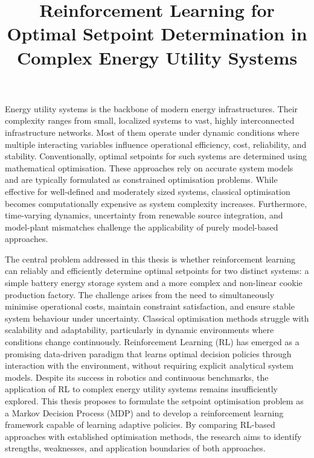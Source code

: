 
\title{Reinforcement Learning for Optimal Setpoint Determination in Complex Energy Utility Systems}
\maketitle

\par
Energy utility systems is the backbone of modern energy infrastructures. Their complexity ranges from small, localized systems to vast, highly interconnected infrastructure networks. Most of them operate under dynamic conditions where multiple interacting variables influence operational efficiency, cost, reliability, and stability. Conventionally, optimal setpoints for such systems are determined using mathematical optimisation. These approaches rely on accurate system models and are typically formulated as constrained optimisation problems. While effective for well-defined and moderately sized systems, classical optimisation becomes computationally expensive as system complexity increases. Furthermore, time-varying dynamics, uncertainty from renewable source integration, and model-plant mismatches challenge the applicability of purely model-based approaches.

\vspace{0.5pt}
\par
The central problem addressed in this thesis is whether reinforcement learning can reliably and efficiently determine optimal setpoints for two distinct systems: a simple battery energy storage system and a more complex and non-linear cookie production factory. The challenge arises from the need to simultaneously minimise operational costs, maintain constraint satisfaction, and ensure stable system behaviour under uncertainty. Classical optimisation methods struggle with scalability and adaptability, particularly in dynamic environments where conditions change continuously. Reinforcement Learning (RL) has emerged as a promising data-driven paradigm that learns optimal decision policies through interaction with the environment, without requiring explicit analytical system models. Despite its success in robotics and continuous benchmarks, the application of RL to complex energy utility systems remains insufficiently explored. This thesis proposes to formulate the setpoint optimisation problem as a Markov Decision Process (MDP) and to develop a reinforcement learning framework capable of learning adaptive policies. By comparing RL-based approaches with established optimisation methods, the research aims to identify strengths, weaknesses, and application boundaries of both approaches.

